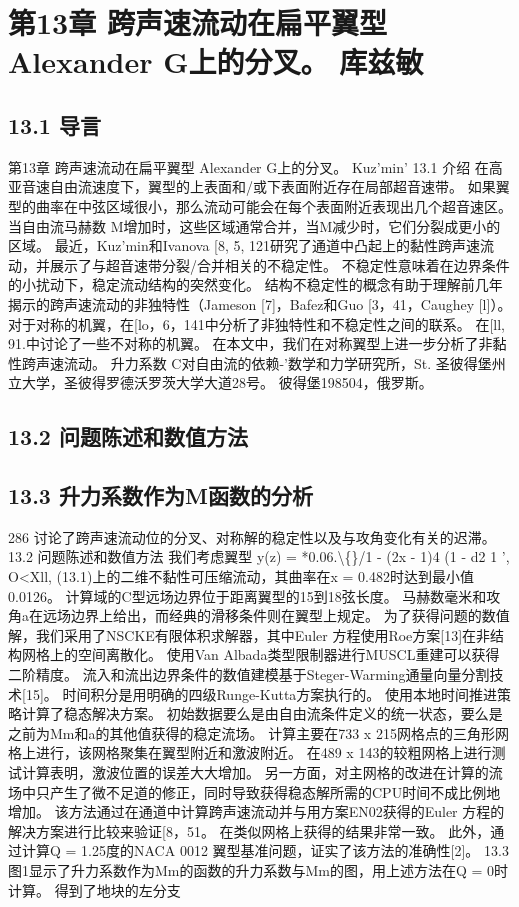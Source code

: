 \documentclass[UTF8,11pt,a4paper,openany,fontset=fandol]{ctexbook}
\begin{document}
\chapter{第13章 跨声速流动在扁平翼型 Alexander G上的分叉。 库兹敏}
\section{13.1 导言}
第13章 跨声速流动在扁平翼型 Alexander G上的分叉。 Kuz'min' 13.1 介绍 在高亚音速自由流速度下，翼型的上表面和/或下表面附近存在局部超音速带。 如果翼型的曲率在中弦区域很小，那么流动可能会在每个表面附近表现出几个超音速区。 当自由流马赫数 M增加时，这些区域通常合并，当M减少时，它们分裂成更小的区域。 最近，Kuz'min和Ivanova [8, 5, 121研究了通道中凸起上的黏性跨声速流动，并展示了与超音速带分裂/合并相关的不稳定性。 不稳定性意味着在边界条件的小扰动下，稳定流动结构的突然变化。 结构不稳定性的概念有助于理解前几年揭示的跨声速流动的非独特性（Jameson [7]，Bafez和Guo [3，41，Caughey [l]）。 对于对称的机翼，在[lo，6，141中分析了非独特性和不稳定性之间的联系。 在[ll, 91.中讨论了一些不对称的机翼。 在本文中，我们在对称翼型上进一步分析了非黏性跨声速流动。 升力系数 C对自由流的依赖-'数学和力学研究所，St. 圣彼得堡州立大学，圣彼得罗德沃罗茨大学大道28号。 彼得堡198504，俄罗斯。

\section{13.2 问题陈述和数值方法}
\section{13.3 升力系数作为M函数的分析}
286 讨论了跨声速流动位的分叉、对称解的稳定性以及与攻角变化有关的迟滞。 13.2 问题陈述和数值方法 我们考虑翼型 y(z) = *0.06.\textbackslash\{\}/1 - (2x - 1)4 (1 - d2 1 ', O<Xll, (13.1)上的二维不黏性可压缩流动，其曲率在x = 0.482时达到最小值0.0126。 计算域的C型远场边界位于距离翼型的15到18弦长度。 马赫数毫米和攻角a在远场边界上给出，而经典的滑移条件则在翼型上规定。 为了获得问题的数值解，我们采用了NSCKE有限体积求解器，其中Euler 方程使用Roe方案[13]在非结构网格上的空间离散化。 使用Van Albada类型限制器进行MUSCL重建可以获得二阶精度。 流入和流出边界条件的数值建模基于Steger-Warming通量向量分割技术[15]。 时间积分是用明确的四级Runge-Kutta方案执行的。 使用本地时间推进策略计算了稳态解决方案。 初始数据要么是由自由流条件定义的统一状态，要么是之前为Mm和a的其他值获得的稳定流场。 计算主要在733 x 215网格点的三角形网格上进行，该网格聚集在翼型附近和激波附近。 在489 x 143的较粗网格上进行测试计算表明，激波位置的误差大大增加。 另一方面，对主网格的改进在计算的流场中只产生了微不足道的修正，同时导致获得稳态解所需的CPU时间不成比例地增加。 该方法通过在通道中计算跨声速流动并与用方案EN02获得的Euler 方程的解决方案进行比较来验证[8，51。 在类似网格上获得的结果非常一致。 此外，通过计算Q = 1.25度的NACA 0012 翼型基准问题，证实了该方法的准确性[2]。 13.3 图1显示了升力系数作为Mm的函数的升力系数与Mm的图，用上述方法在Q = 0时计算。 得到了地块的左分支
\end{document}
